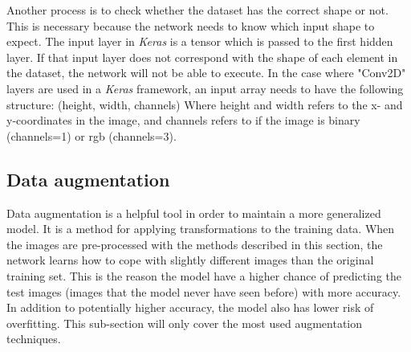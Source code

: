\documentclass[USenglish]{ifimaster}  %
\begin{document}
Another process is to check whether the dataset has the correct shape or not. This is necessary because the network needs to know which input shape to expect. The input layer in \textit{Keras} is a tensor which is passed to the first hidden layer. If that input layer does not correspond with the shape of each element in the dataset, the network will not be able to execute. In the case where "Conv2D" layers are used in a \textit{Keras} framework, an input array needs to have the following structure:
\newline
\newline
(height, width, channels)
\newline
\newline
Where height and width refers to the x- and y-coordinates in the image, and channels refers to if the image is binary (channels=1) or \ac{rgb} (channels=3).

\subsection{Data augmentation}
Data augmentation is a helpful tool in order to maintain a more generalized model. It is a method for applying transformations to the training data. When the images are pre-processed with the methods described in this section, the network learns how to cope with slightly different images than the original training set. This is the reason the model have a higher chance of predicting the test images (images that the model never have seen before) with more accuracy. In addition to potentially higher accuracy, the model also has lower risk of overfitting. This sub-section will only cover the most used augmentation techniques.  
\end{document}
